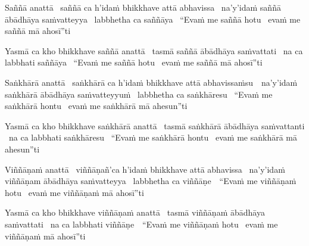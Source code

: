 \begin{pali-hang}
  Saññā anattā \breathmark\ saññā ca h'idaṁ bhikkhave attā abhavissa \breathmark\ na'y'idaṁ saññā ābādhāya saṁvatteyya \breathmark\ labbhetha ca saññāya \breathmark\ ``Evaṁ me saññā hotu \breathmark\ evaṁ me saññā mā ahosī''ti
\end{pali-hang}
\begin{pali-hangtogether}
  Yasmā ca kho bhikkhave saññā anattā \breathmark\ tasmā saññā ābādhāya saṁvattati \breathmark\ na ca labbhati saññāya \breathmark\ ``Evaṁ me saññā hotu \breathmark\ evaṁ me saññā mā ahosī''ti
\end{pali-hangtogether}

\begin{pali-hang}
  Saṅkhārā anattā \breathmark\ saṅkhārā ca h'idaṁ bhikkhave attā \mbox{abhavissaṁsu}~\breathmark\ na'y'idaṁ saṅkhārā ābādhāya saṁvatteyyuṁ \breathmark\ labbhetha ca saṅkhāresu \breathmark\ ``Evaṁ me saṅkhārā hontu \breathmark\ evaṁ me saṅkhārā mā ahesun''ti
\end{pali-hang}
\begin{pali-hangtogether}
  Yasmā ca kho bhikkhave saṅkhārā anattā \breathmark\ tasmā saṅkhārā ābādhāya saṁvattanti \breathmark\ na ca labbhati saṅkhāresu \breathmark\ ``Evaṁ me saṅkhārā hontu \breathmark\ evaṁ me saṅkhārā mā ahesun''ti
\end{pali-hangtogether}

\begin{pali-hang}
  Viññāṇaṁ anattā \breathmark\ viññāṇañ'ca h'idaṁ bhikkhave attā abhavissa \breathmark\ na'y'idaṁ viññāṇam ābādhāya saṁvatteyya \breathmark\ labbhetha ca \mbox{viññāṇe}~\breathmark\ ``Evaṁ me viññāṇaṁ hotu \breathmark\ evaṁ me viññāṇaṁ mā ahosī''ti
\end{pali-hang}
\begin{pali-hangtogether}
  Yasmā ca kho bhikkhave viññāṇaṁ anattā \breathmark\ tasmā viññāṇaṁ ābādhāya saṁvattati \breathmark\ na ca labbhati \mbox{viññāṇe}~\breathmark\ ``Evaṁ me viññāṇaṁ hotu \breathmark\ evaṁ me viññāṇaṁ mā ahosī''ti
\end{pali-hangtogether}

